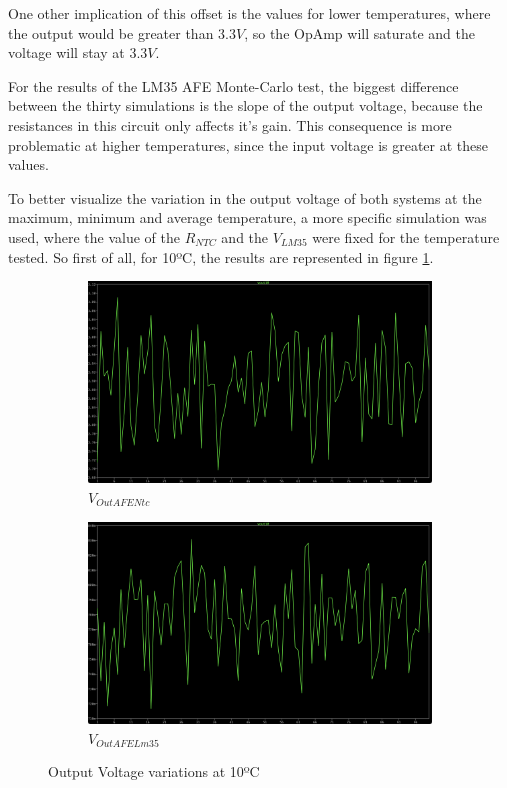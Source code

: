 \documentclass[12pt]{article}
\begin{document}
    One other implication of this offset is the values for lower temperatures, where the output would be greater than $3.3V$, so the OpAmp will saturate and the voltage will stay at $3.3V$.

    For the results of the LM35 AFE Monte-Carlo test, the biggest difference between the thirty simulations is the slope of the output voltage,
    because the resistances in this circuit only affects it's gain. This consequence is more problematic at higher temperatures, since the input voltage is greater at these values.

    To better visualize the variation in the output voltage of both systems at the maximum, minimum and average temperature, a more specific simulation was used, where the value of the $R_{NTC}$ and the
    $V_{LM35}$ were fixed for the temperature tested.
    So first of all, for 10ºC, the results are represented in figure \ref{10ºC - montecarlo}.

    \begin{figure}[H]
        \centering
        \begin{subfigure}{0.45\textwidth}
            \centering
            \includegraphics[width=\textwidth]{images/vntc10.png}
            \caption{ $V_{OutAFENtc}$ }
        \end{subfigure}\hfill
        \begin{subfigure}{0.45\textwidth}
            \centering
            \includegraphics[width=\textwidth]{images/vlm10.png}
            \caption{$V_{OutAFELm35}$}
        \end{subfigure}
        \caption{Output Voltage variations at 10ºC}
        \label{10ºC - montecarlo}
    \end{figure}
\end{document}
